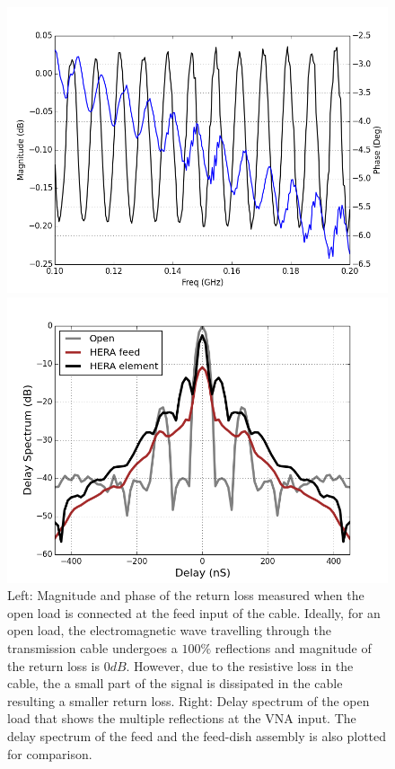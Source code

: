 \documentclass[twocolumn]{emulateapj}
\begin{document}
    \begin{figure}[ht]
    \begin{minipage}[b]{0.5\linewidth}
    \centering
    \includegraphics[angle=0, width=\linewidth]{plots/open_RL.png}
    \end{minipage}
    \hspace{0.1cm}
    \begin{minipage}[b]{0.5\linewidth}
    \centering
    \includegraphics[angle=0, width=\linewidth]{GB_reflectometry_part3/plot/open_delay.png}
    \end{minipage}
    \caption{Left: Magnitude and phase of the return loss measured when the open load is connected at the feed input of the cable. Ideally, for an open load, the electromagnetic wave travelling through the transmission cable undergoes a $100\%$ reflections and magnitude of the return loss is $0dB$. However, due to the resistive loss in the cable, the a small part of the signal is dissipated in the cable resulting a smaller return loss.  Right: Delay spectrum of the open load that shows the multiple reflections at the VNA input. The delay spectrum of the feed and the feed-dish assembly is also plotted for comparison.}
    \label{fig:open_RL}       
    \end{figure}
    
\end{document}
